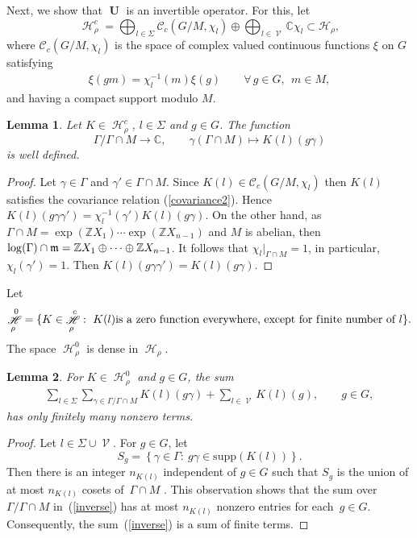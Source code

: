 \documentclass[11pt]{article}
\newtheorem{lemma}{Lemma}
\providecommand{\mathds}[1]{\mathbb{#1}}
\newcommand{\set}[1]{\left\{#1\right\}}
\DeclareMathOperator{\U}{\mathbf{U}}
\DeclareMathOperator{\nongen}{\mathcal{V}}
\DeclareMathOperator{\Hi}{\mathscr{H}}
\def\dsc{{\mathds C}}
\def\dsz{{\mathds Z}}
\begin{document}
Next, we show that $\U$ is an invertible operator. For this, let
\[
 \Hi_\rho^c =  \bigoplus_{l\in \Sigma} \mathcal{C}_c(G/M,
\chi_l) \oplus \bigoplus_{l\in \nongen} \mathds{C} \chi_l \subset
\mathscr{H}_\rho,
\]
 where $\mathcal{C}_c(G/M, \chi_l)$ is the space
of complex valued continuous functions $\xi$ on $G$ satisfying
\begin{gather}\label{covariance2}
\xi(gm)=\chi_l^{-1}(m) \xi(g) \qquad
  \forall\, g\in G, \ \ m\in M,
\end{gather}
and having a compact support modulo $M$.



\begin{lemma} Let $K\in \Hi_\rho^c$, $l\in \Sigma$ and $g\in G$. The
function
\[
\Gamma/\Gamma\cap
M \rightarrow \dsc, \qquad \gamma (\Gamma\cap M)\mapsto
K(l)(g\gamma)
\]
 is well defined.
\end{lemma}

\begin{proof} Let $\gamma\in \Gamma$ and $\gamma'\in\Gamma\cap M$.
Since $K(l)\in \mathcal{C}_c(G/M, \chi_l)$ then $K(l)$ satisf\/ies the
covariance relation (\ref{covariance2}). Hence $
K(l)(g\gamma\gamma') = \chi_l^{-1}(\gamma') K(l)(g\gamma)$. On the
other hand, as $\Gamma\cap M= \exp(\dsz X_1)\cdots \exp(\dsz
X_{n-1})$ and $M$ is abelian, then $\log(\Gamma)\cap \frak m= \dsz
X_1\oplus \dots \oplus \dsz X_{n-1}$. It follows that
$\chi_l\vert_{\Gamma\cap M}=1$, in particular, $\chi_l(\gamma')=1$.
Then $ K(l)(g\gamma\gamma') = K(l)(g\gamma)$.
\end{proof}

Let
\begin{gather*}
 \Hi_\rho^0 =\{K\in \Hi_\rho^c:\ K(l)  \mbox{is a zero function everywhere, except
for f\/inite number of  } l\}.
\end{gather*}
The space $ \Hi_\rho^0$ is dense in $\Hi_\rho$.


\begin{lemma} For $K\in \Hi_\rho^0 $ and $g\in G$, the sum
\begin{gather}\label{inverse}
  \sum_{l\in \Sigma} \sum_{\gamma\in \Gamma/\Gamma\cap
M} K(l)(g\gamma)+ \sum _{l\in \nongen} K(l)(g), \qquad g\in
G,
\end{gather} has only finitely many nonzero terms.
\end{lemma}

\begin{proof} Let  $l\in \Sigma\cup \nongen$.
For $g\in G$, let
\[
S_g=\set{\gamma\in \Gamma:\ g\gamma\in \mathrm{supp}(K(l))}.
\]
Then there is an integer $n_{K(l)}$ independent of $g\in G$ such
that $S_g$ is the union of at most $n_{K(l)}$ cosets of~$\Gamma\cap M$ \cite[Lemma~3.2]{Cor4}. This observation shows that the sum
over $\Gamma/\Gamma\cap M$  in~(\ref{inverse}) has at most
$n_{K(l)}$ nonzero entries for each~$g\in G$. Consequently, the sum~(\ref{inverse}) is a sum of f\/inite terms.
\end{proof}
\end{document}
